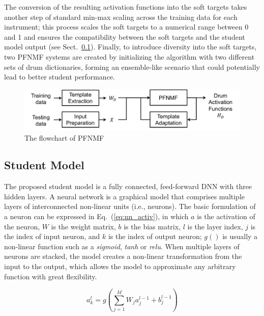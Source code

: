 \documentclass{article}
\begin{document}
The conversion of the resulting activation functions into the soft targets takes another step of standard min-max scaling across the training data for each instrument; this process scales the soft targets to a numerical range between 0 and 1 and ensures the compatibility between the soft targets and the student model output (see Sect.~\ref{subsec:nn}). Finally, to introduce diversity into the soft targets, two PFNMF systems are created by initializing the algorithm with two different sets of drum dictionaries, forming an ensemble-like scenario that could potentially lead to better student performance. %

\begin{figure}
\centering
\includegraphics[width = 8 cm]{./figs/nmf_flowchart_remake.pdf}
\caption{The flowchart of PFNMF \cite{Wu2015a}}
\label{fig:pfnmf}
\end{figure}

\subsection{Student Model}\label{subsec:nn}
The proposed student model is a fully connected, feed-forward DNN with three hidden layers. A neural network is a graphical model that comprises multiple layers of interconnected non-linear units (i.e., neurons). The basic formulation of a neuron can be expressed in Eq.~(\ref{eq:nn_activ}), in which $a$ is the activation of the neuron, $W$ is the weight matrix, $b$ is the bias matrix, $l$ is the layer index, $j$ is the index of input neuron, and $k$ is the index of output neuron; $g( )$ is usually a non-linear function such as a \textit{sigmoid}, \textit{tanh} or \textit{relu}. When multiple layers of neurons are stacked, the model creates a non-linear transformation from the input to the output, which allows the model to approximate any arbitrary function with great flexibility. 

\begin{equation}\label{eq:nn_activ}
a_{k}^{l} = g\left( \sum_{j=1}^{M} W_{j} a_{j}^{l-1} + b_{j}^{l-1}\right)
\end{equation}
\end{document}

